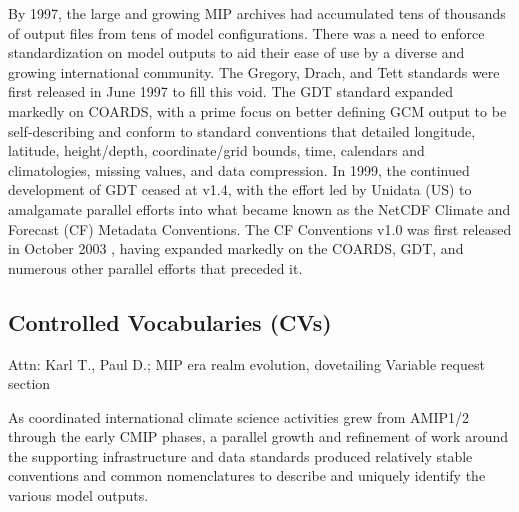 \documentclass[gmd, preprint]{copernicus}
\newcommand{\mycomment}[1]{}
\def\cred#1{{\color{red}#1}}
\begin{document}
By 1997, the large and growing MIP archives had accumulated tens of thousands of output files from tens of model configurations. There was a need to enforce standardization on model outputs to aid their ease of use by a diverse and growing international community. The Gregory, Drach, and Tett \citep[GDT v0;][]{gregory_gdt_1999} standards were first released in June 1997 to fill this void. The GDT standard expanded markedly on COARDS, with a prime focus on better defining GCM output to be self-describing and conform to standard conventions that detailed longitude, latitude, height/depth, coordinate/grid bounds, time, calendars and climatologies, missing values, and data compression. In 1999, the continued development of GDT ceased at v1.4, with the effort led by Unidata (US) to amalgamate parallel efforts into what became known as the NetCDF Climate and Forecast (CF) Metadata Conventions. The CF Conventions v1.0 was first released in October 2003 \citep{eaton_netcdf_2024}, having expanded markedly on the COARDS, GDT, and numerous other parallel efforts that preceded it.

\mycomment{
https://www.unidata.ucar.edu/software/netcdf/conventions.html
https://www.unidata.ucar.edu/software/netcdf/coords/proposals.html
COARDS 1995 - https://web.archive.org/web/20100527095818/http://ferret.wrc.noaa.gov/noaa_coop/coop_cdf_profile.html
GDT 1997
https://www.unidata.ucar.edu/mailing_lists/archives/netcdfgroup/1997/msg00080.html
https://www.unidata.ucar.edu/software/netcdf/coords/0054.html 1997
https://web.archive.org/web/20100610102527/http://www-pcmdi.llnl.gov/drach/GDT_convention.html 1999
https://web.archive.org/web/20040604041414/http://www-pcmdi.llnl.gov/drach/netCDF.html
CF 2003 - https://cfconventions.org/Data/cf-conventions/cf-conventions-1.11/cf-conventions.html#_version_1_0_28_october_2003 
}


\subsection{Controlled Vocabularies (CVs)}
\label{sec:CMIPCVs}
\cred{Attn: Karl T., Paul D.; MIP era realm evolution, dovetailing Variable request section}

As coordinated international climate science activities grew from AMIP1/2 through the early CMIP phases, a parallel growth and refinement of work around the supporting infrastructure and data standards produced relatively stable conventions and common nomenclatures to describe and uniquely identify the various model outputs.
\end{document}
